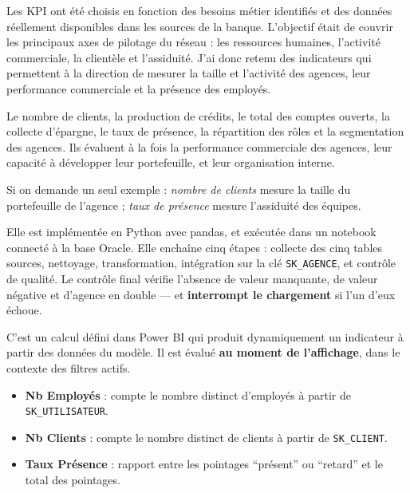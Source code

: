 \documentclass[a4paper,11pt]{article}
\begin{document}

Les KPI ont été choisis en fonction des besoins métier identifiés et des données
réellement disponibles dans les sources de la banque. L'objectif était de couvrir
les principaux axes de pilotage du réseau : les ressources humaines, l'activité
commerciale, la clientèle et l'assiduité. J'ai donc retenu des indicateurs qui
permettent à la direction de mesurer la taille et l'activité des agences, leur
performance commerciale et la présence des employés.


Le nombre de clients, la production de crédits, le total des comptes ouverts, la
collecte d'épargne, le taux de présence, la répartition des rôles et la
segmentation des agences. Ils évaluent à la fois la performance commerciale des
agences, leur capacité à développer leur portefeuille, et leur organisation
interne.

\begin{note}
\small Si on demande un seul exemple : \emph{nombre de clients} mesure la taille
du portefeuille de l'agence ; \emph{taux de présence} mesure l'assiduité des
équipes.
\end{note}


Elle est implémentée en Python avec pandas, et exécutée dans un notebook
connecté à la base Oracle. Elle enchaîne cinq étapes : collecte des cinq tables
sources, nettoyage, transformation, intégration sur la clé \texttt{SK\_AGENCE},
et contrôle de qualité. Le contrôle final vérifie l'absence de valeur manquante,
de valeur négative et d'agence en double --- et \textbf{interrompt le
chargement} si l'un d'eux échoue.


C'est un calcul défini dans Power BI qui produit dynamiquement un indicateur à
partir des données du modèle. Il est évalué \textbf{au moment de l'affichage},
dans le contexte des filtres actifs.


\begin{itemize}[leftmargin=*,itemsep=1pt]
  \item \textbf{Nb Employés} : compte le nombre distinct d'employés à partir de \texttt{SK\_UTILISATEUR}.
  \item \textbf{Nb Clients} : compte le nombre distinct de clients à partir de \texttt{SK\_CLIENT}.
  \item \textbf{Taux Présence} : rapport entre les pointages \enquote{présent} ou \enquote{retard} et le total des pointages.
\end{itemize}
\end{document}
